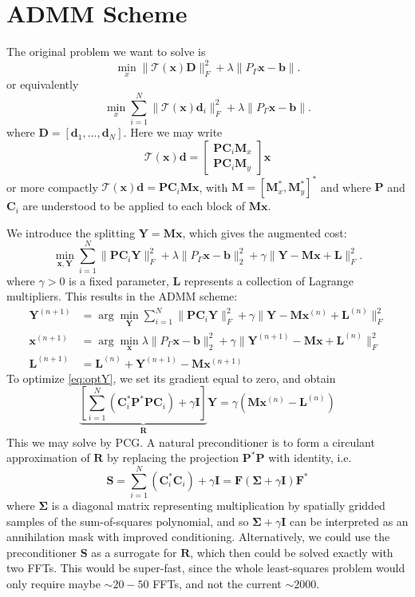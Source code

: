 \documentclass[11pt,draftcls,onecolumn]{IEEEtran}
\newcommand{\mbf}{\mathbf}
\newcommand{\bs}{\boldsymbol}
\begin{document}
\section{ADMM Scheme}
The original problem we want to solve is
\[
\min_x \|\mathcal{T}(\mbf x) \mbf D\|_F^2 + \lambda \|P_\Gamma \mbf x - \mbf b\|.
\]
or equivalently 
\[
\min_x \sum_{i=1}^N\|\mathcal{T}(\mbf x) \mbf d_i\|_F^2 + \lambda \|P_\Gamma \mbf x - \mbf b\|.
\]
where $\mbf D = [\mbf d_1,\ldots,\mbf d_N]$. Here we may write 
\[
\mathcal{T}(\mbf x)\mbf d = 
\begin{bmatrix}
\mbf P \mbf C_i \mbf M_x\\
\mbf P \mbf C_i \mbf M_y
\end{bmatrix}\mbf x
\]
or more compactly $\mathcal{T}(\mbf x)\mbf d = \mbf P \mbf C_i \mbf M\mbf x$, with $\mbf M = [\mbf M_x^*, \mbf M_y^*]^*$ and where $\mbf P$ and $\mbf C_i$ are understood to be applied to each block of $\mbf M\mbf x$.

We introduce the splitting $\mbf Y = \mbf M \mbf x$, which gives the augmented cost:
\[
\min_{\mbf x,\mbf Y} \sum_{i=1}^N\|\mbf P \mbf C_i \mbf Y\|_F^2 + \lambda \|P_\Gamma \mbf x - \mbf b\|_2^2 + \gamma \| \mbf Y - \mbf M\mbf x + \mbf L \|_F^2.
\]
where $\gamma > 0$ is a fixed parameter, $\mbf L$ represents a collection of Lagrange multipliers. This results in the ADMM scheme:
\begin{align}
\label{eq:optY}
\mbf Y^{(n+1)} & = \arg\min_{\mbf Y} \sum_{i=1}^N\|\mbf P \mbf C_i \mbf Y\|_F^2  + \gamma \| \mbf Y - \mbf M\mbf x^{(n)} + \mbf L^{(n)} \|_F^2\\
\label{eq:optx}
\mbf x^{(n+1)} & = \arg\min_{\mbf x} \lambda\|P_\Gamma \mbf x - \mbf b\|_2^2 + \gamma \| \mbf Y^{(n+1)} - \mbf M\mbf x + \mbf L^{(n)}\|_F^2\\
\label{eq:optLam}
\mbf L^{(n+1)} & = \mbf L^{(n)} +  \mbf Y^{(n+1)} - \mbf M\mbf x^{(n+1)}
\end{align}
To optimize \eqref{eq:optY}, we set its gradient equal to zero, and obtain
\[
\underbrace{\left[\sum_{i=1}^N (\mbf C_i^*\mbf P^*\mbf P \mbf C_i ) + \gamma \mbf I\right]}_{\mbf R}\mbf Y = \gamma(\mbf M\mbf x^{(n)} - \mbf L^{(n)})
\]
This we may solve by PCG. A natural preconditioner is to form a circulant approximation of $\mbf R$ by replacing the projection $\mbf P^*\mbf P$ with identity, i.e. 
\[
\mbf S = \sum_{i=1}^N (\mbf C_i^*\mbf C_i ) + \gamma \mbf I = \mbf F (\bs\Sigma + \gamma \mbf I)\mbf F^* 
\]
where $\bs \Sigma$ is a diagonal matrix representing multiplication by spatially gridded samples of the sum-of-squares polynomial, and so $\bs \Sigma + \gamma \mbf I$ can be interpreted as an annihilation mask with improved conditioning. Alternatively, we could use the preconditioner $\mbf S$ as a surrogate for $\mbf R$, which then could be solved exactly with two FFTs. This would be super-fast, since the whole least-squares problem would only require maybe $\sim 20-50$ FFTs, and not the current $\sim 2000$. 
\end{document}
